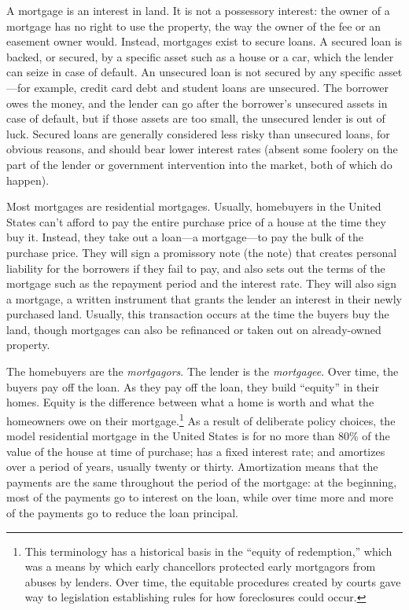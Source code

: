 A mortgage is an interest in land.  It is not a possessory interest: the owner
of a mortgage has no right to use the property, the way the owner of the fee or
an easement owner would.  Instead, mortgages exist to secure loans.  A secured
loan is backed, or secured, by a specific asset such as a house or a car, which
the lender can seize in case of default.  An unsecured loan is not secured by
any specific asset---for example, credit card debt and student loans are
unsecured.  The borrower owes the money, and the lender can go after the
borrower's unsecured assets in case of default, but if those assets are too
small, the unsecured lender is out of luck.  Secured loans are generally
considered less risky than unsecured loans, for obvious reasons, and should
bear lower interest rates (absent some foolery on the part of the lender or
government intervention into the market, both of which do happen).  

Most mortgages are residential mortgages.  Usually, homebuyers in the United
States can't afford to pay the entire purchase price of a house at the time they
buy it. Instead, they take out a loan---a mortgage---to pay the bulk of the
purchase price.  They will sign a promissory note (the note) that creates
personal liability for the borrowers if they fail to pay, and also sets out the
terms of the mortgage such as the repayment period and the interest rate.  They
will also sign a mortgage, a written instrument that grants the lender an
interest in their newly purchased land.  Usually, this transaction occurs at the
time the buyers buy the land, though mortgages can also be refinanced or taken
out on already-owned property.

The homebuyers are the \textit{mortgagors}.  The lender is the
\textit{mortgagee}.  Over time, the buyers pay off the loan.  As they pay off
the loan, they build ``equity'' in their homes.  Equity is the difference
between what a home is worth and what the homeowners owe on their
mortgage.\footnote{ This terminology has a historical basis in the ``equity of
redemption,'' which was a means by which early chancellors protected early
mortgagors from abuses by lenders.  Over time, the equitable procedures created
by courts gave way to legislation establishing rules for how foreclosures could
occur.}  As a result of deliberate policy choices, the model residential
mortgage in the United States is for no more than 80\% of the value of the house
at time of purchase; has a fixed interest rate; and amortizes over a period of
years, usually twenty or thirty.  Amortization means that the payments are the
same throughout the period of the mortgage: at the beginning, most of the
payments go to interest on the loan, while over time more and more of the
payments go to reduce the loan principal.  

